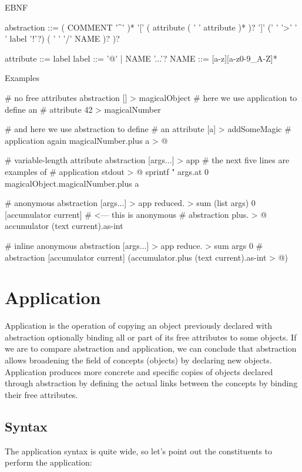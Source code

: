 \documentclass[12pt]{book}
\begin{document}
EBNF

\begin{ffcode}
abstraction ::= ( COMMENT '^' )*
            '[' ( attribute ( ' ' attribute )* )? ']'
            (' ' '>' ' ' label '!'?) ( ' ' '/' NAME )? )?
            
attribute ::= label
label ::= '@' | NAME '...'?
NAME ::= [a-z][a-z0-9_A-Z]*
\end{ffcode}

Examples
\begin{ffcode}
# no free attributes abstraction
[] > magicalObject
  # here we use application to define an 
  # attribute
  42 > magicalNumber

  # and here we use abstraction to define 
  # an attribute
  [a] > addSomeMagic
    # application again
    magicalNumber.plus a > @

# variable-length attribute abstraction
[args...] > app
  # the next five lines are examples of 
  # application
  stdout > @
    sprintf
      "\n%
      args.at 0
      magicalObject.magicalNumber.plus a

# anonymous abstraction
[args...] > app
  reduced. > sum
    (list args)
    0
    [accumulator current] # <--- this is anonymous
    # abstraction
      plus. > @
        accumulator
        (text current).as-int

# inline anonymous abstraction
[args...] > app
  reduce. > sum
    args
    0
    # abstraction
    [accumulator current] (accumulator.plus (text current).as-int > @)
\end{ffcode}

\section{Application}
Application is the operation of copying an object previously declared with abstraction optionally binding all or part of its free attributes to some objects.
If we are to compare abstraction and application, we can conclude that abstraction allows broadening the field of concepts (objects) by declaring new objects. Application produces more concrete and specific copies of objects declared through abstraction by defining the actual links between the concepts by binding their free attributes.

\subsection{Syntax}
The application syntax is quite wide, so let's point out the constituents to perform the application:
\end{document}
